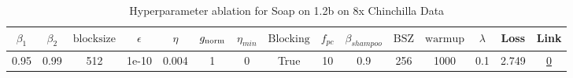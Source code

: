 \begin{table}[H]
\centering
\caption{Hyperparameter ablation for Soap on 1.2b on 8x Chinchilla Data}
\label{tab:ablation_soap_1.2b_on_8x_chinchilla_data}
\begin{tabular}{ccccccccccccccc}
\toprule
$\beta_1$ & $\beta_2$ & $\mathrm{block size}$ & $\epsilon$ & $\eta$ & $g_{\mathrm{norm}}$ & $\eta_{min}$ & $\mathrm{Blocking}$ & $f_{pc}$ & $\beta_{shampoo}$ & $\mathrm{BSZ}$ & $\mathrm{warmup}$ & $\lambda$ & Loss & Link \\
\midrule
0.95 & 0.99 & 512 & 1e-10 & 0.004 & 1 & 0 & True & 10 & 0.9 & 256 & 1000 & 0.1 & 2.749 & \href{https://wandb.ai/marin-community/optimizer-scaling/runs/sweep-1.2b-193B-soapeweightf32ebf088lr0.004-wd0.1-minlr0.0-warmu-029405}{0} \\
\midrule
\bottomrule
\end{tabular}
\end{table}

